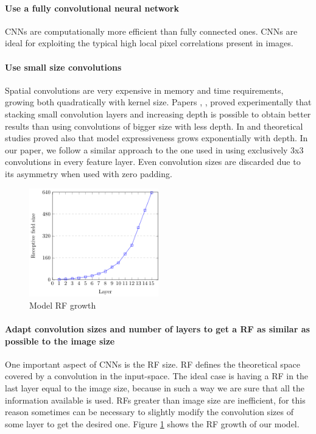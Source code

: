 \documentclass[review]{elsarticle}
\theoremstyle{definition} %
\theoremstyle{remark}
\begin{document}
\paragraph{Use a fully convolutional neural network} CNNs are computationally more efficient than fully connected ones. CNNs are ideal for exploiting the typical high local pixel correlations present in images.

\paragraph{Use small size convolutions} Spatial convolutions are very expensive in memory and time requirements, growing both quadratically with kernel size. Papers \cite{vggnet}, \cite{he2016deep},  \cite{szegedy2016rethinking} proved experimentally that stacking small convolution layers and increasing depth is possible to obtain better results than using convolutions of bigger size with less depth. In \cite{eldan2016power} and \cite{cohen2016expressive} theoretical studies proved also that model expressiveness grows exponentially with depth. In our paper, we follow a similar approach to the one used in \cite{vggnet} using exclusively 3x3 convolutions in every feature layer. Even convolution sizes are discarded due to its asymmetry when used with zero padding.

\begin{figure}[ht!]
	\centering
	\includegraphics[width=0.50\textwidth]{./figures/receptive_field_640.pdf}
	\caption{Model RF growth}
	\label{fig:rf_graph}
\end{figure}

\paragraph{Adapt convolution sizes and number of layers to get a RF as similar as possible to the image size} One important aspect of CNNs is the RF size. RF defines the theoretical space covered by a convolution in the input-space. The ideal case is having a RF in the last layer equal to the image size, because in such a way we are sure that all the information available is used. RFs greater than image size are inefficient, for this reason sometimes can be necessary to slightly modify the convolution sizes of some layer to get the desired one. Figure \ref{fig:rf_graph} shows the RF growth of our model.
\end{document}
